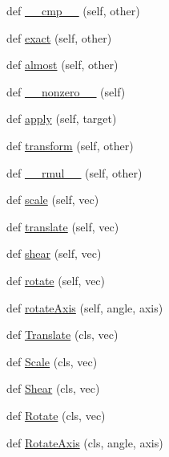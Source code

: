 \begin{DoxyCompactItemize}
\item 
def \hyperlink{classminivec_1_1minivec_1_1_mat_a85ddd2f35bf6b46a0634c09cd94ab5ba}{\+\_\+\+\_\+cmp\+\_\+\+\_\+} (self, other)
\item 
def \hyperlink{classminivec_1_1minivec_1_1_mat_a002d8ba4508f1d8675eefc23935d58bf}{exact} (self, other)
\item 
def \hyperlink{classminivec_1_1minivec_1_1_mat_a0918a01c099515f095be4b846e642682}{almost} (self, other)
\item 
def \hyperlink{classminivec_1_1minivec_1_1_mat_a4f2b45ad9db9208f1a6512b61c19dbc5}{\+\_\+\+\_\+nonzero\+\_\+\+\_\+} (self)
\item 
def \hyperlink{classminivec_1_1minivec_1_1_mat_a0f223495c8c3d91f26b5d9e343bf1af7}{apply} (self, target)
\item 
def \hyperlink{classminivec_1_1minivec_1_1_mat_a18cdaa87999bc6cbd1652dca3aa63468}{transform} (self, other)
\item 
def \hyperlink{classminivec_1_1minivec_1_1_mat_a6fc036840a152ec283894c481aa057bc}{\+\_\+\+\_\+rmul\+\_\+\+\_\+} (self, other)
\item 
def \hyperlink{classminivec_1_1minivec_1_1_mat_a155e41b3f4f78f7d0264d6ddc113da79}{scale} (self, vec)
\item 
def \hyperlink{classminivec_1_1minivec_1_1_mat_a6378a96e89d988b74338258e01e8a9c3}{translate} (self, vec)
\item 
def \hyperlink{classminivec_1_1minivec_1_1_mat_a03450442e730a17d66e07614c836418d}{shear} (self, vec)
\item 
def \hyperlink{classminivec_1_1minivec_1_1_mat_a7d119e23e74d182f54ca330fe9c65a3c}{rotate} (self, vec)
\item 
def \hyperlink{classminivec_1_1minivec_1_1_mat_af0762830b2b6decbc81009b4a7b7564c}{rotate\+Axis} (self, angle, axis)
\item 
def \hyperlink{classminivec_1_1minivec_1_1_mat_abdea55611ff8a295a5ab7abeffcf5337}{Translate} (cls, vec)
\item 
def \hyperlink{classminivec_1_1minivec_1_1_mat_a0120a14122002f4358a7cba3af274938}{Scale} (cls, vec)
\item 
def \hyperlink{classminivec_1_1minivec_1_1_mat_adadc85f5611a25ebfa70b823f9b812b7}{Shear} (cls, vec)
\item 
def \hyperlink{classminivec_1_1minivec_1_1_mat_ac59f34d7c3a6952b1296dc43add6244d}{Rotate} (cls, vec)
\item 
def \hyperlink{classminivec_1_1minivec_1_1_mat_a1bb7ce62b34b028fb462feb639065772}{Rotate\+Axis} (cls, angle, axis)

\end{DoxyCompactItemize}
